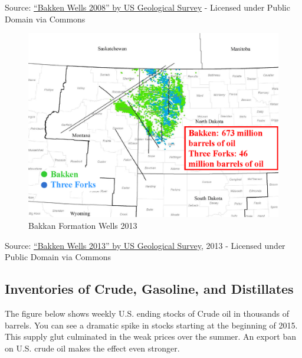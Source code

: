\documentclass[
  letterpaper,
  DIV=11,
  numbers=noendperiod]{scrreprt}
\begin{document}
Source:
\href{https://commons.wikimedia.org/wiki/File:Bakken_Wells_2008.png\#/media/File:Bakken_Wells_2008.png}{``Bakken
Wells 2008'' by US Geological Survey} - Licensed under Public Domain via
Commons

\begin{figure}

{\centering \includegraphics{images/Bakken_Wells_2013.png}

}

\caption{Bakkan Formation Wells 2013}

\end{figure}

Source:
\href{https://commons.wikimedia.org/wiki/File:Bakken_Wells_2013.png\#/media/File:Bakken_Wells_2013.png}{``Bakken
Wells 2013'' by US Geological Survey}, 2013 - Licensed under Public
Domain via Commons

\hypertarget{inventories-of-crude-gasoline-and-distillates}{%
\subsection{Inventories of Crude, Gasoline, and
Distillates}\label{inventories-of-crude-gasoline-and-distillates}}

The figure below shows weekly U.S. ending stocks of Crude oil in
thousands of barrels. You can see a dramatic spike in stocks starting at
the beginning of 2015. This supply glut culminated in the weak prices
over the summer. An export ban on U.S. crude oil makes the effect even
stronger.
\end{document}

